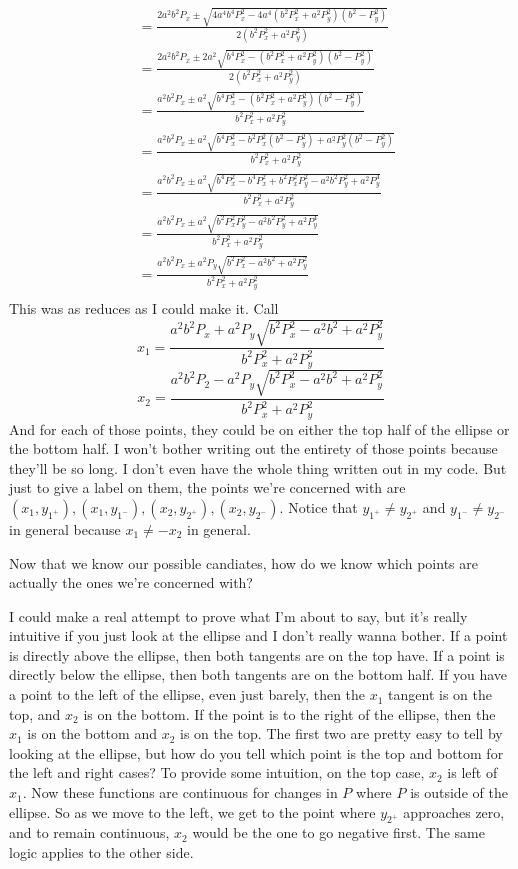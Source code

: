 \documentclass[11pt, oneside]{article}
\begin{document}
\begin{enumerate}
\begin{align*}
			&= \frac{2a^2b^2P_x\pm\sqrt{4a^4b^4P_x^2 - 4a^4\left(b^2P_x^2+a^2P_y^2\right)\left(b^2-P_y^2\right)}}{2(b^2P_x^2+a^2P_y^2)}\\
			&= \frac{2a^2b^2P_x\pm2a^2\sqrt{b^4P_x^2 - \left(b^2P_x^2+a^2P_y^2\right)\left(b^2-P_y^2\right)}}{2(b^2P_x^2+a^2P_y^2)}\\
			&= \frac{a^2b^2P_x\pm a^2\sqrt{b^4P_x^2 - \left(b^2P_x^2+a^2P_y^2\right)\left(b^2-P_y^2\right)}}{b^2P_x^2+a^2P_y^2}\\
			&= \frac{a^2b^2P_x\pm a^2\sqrt{b^4P_x^2 - b^2P_x^2\left(b^2-P_y^2\right)+a^2P_y^2\left(b^2-P_y^2\right)}}{b^2P_x^2+a^2P_y^2}\\
			&= \frac{a^2b^2P_x\pm a^2\sqrt{b^4P_x^2 - b^4P_x^2+b^2P_x^2P_y^2-a^2b^2P_y^2+a^2P_y^4}}{b^2P_x^2+a^2P_y^2}\\
			&= \frac{a^2b^2P_x\pm a^2\sqrt{b^2P_x^2P_y^2-a^2b^2P_y^2+a^2P_y^4}}{b^2P_x^2+a^2P_y^2}\\
			&= \frac{a^2b^2P_x\pm a^2P_y\sqrt{b^2P_x^2-a^2b^2+a^2P_y^2}}{b^2P_x^2+a^2P_y^2}\\
		\end{align*}
		This was as reduces as I could make it. Call
		$$x_1= \frac{a^2b^2P_x+ a^2P_y\sqrt{b^2P_x^2-a^2b^2+a^2P_y^2}}{b^2P_x^2+a^2P_y^2}$$
		$$x_2= \frac{a^2b^2P_2- a^2P_y\sqrt{b^2P_x^2-a^2b^2+a^2P_y^2}}{b^2P_x^2+a^2P_y^2}$$
		And for each of those points, they could be on either the top half of the ellipse or the bottom half.
		I won't bother writing out the entirety of those points because they'll be so long. I don't even have the whole thing written out in my code.
		But just to give a label on them, the points we're concerned with are $(x_1,y_{1^+}), (x_1,y_{1^-}),(x_2,y_{2^+}), (x_2,y_{2^-})$. Notice that
		$y_{1^+}\ne y_{2^+}$ and $y_{1^-}\ne y_{2^-}$ in general because $x_1\ne -x_2$ in general. 

		Now that we know our possible candiates, how do we know which points are actually the ones we're concerned with?

		I could make a real attempt to prove what I'm about to say, but it's really intuitive if you just look at the ellipse and I don't really wanna 
		bother. If a point is directly above the ellipse, then both tangents are on the top have. If a point is directly below the ellipse, then both
		tangents are on the bottom half. If you have a point to the left of the ellipse, even just barely, then the $x_1$ tangent is on the top, and $x_2$
		is on the bottom. If the point is to the right of the ellipse, then the $x_1$ is on the bottom and $x_2$ is on the top.
		The first two are pretty easy to tell by looking at the ellipse, but how do you tell which point is the top and bottom for the left and right 
		cases? To provide some intuition, on the top case, $x_2$ is left of $x_1$. Now these functions are continuous for changes in $P$ where
		$P$ is outside of the ellipse. So as we move to the left, we get to the point where $y_{2^+}$ approaches zero, and to remain continuous, $x_2$ 
		would be the one to go negative first. The same logic applies to the other side.


\end{enumerate}
\end{document}
